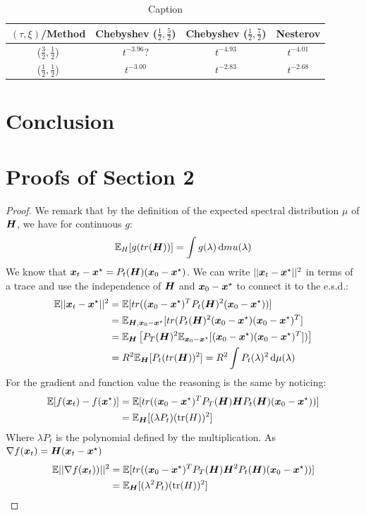 \documentclass{article}
\begin{document}
\begin{table}[H]
    \centering
    \begin{tabular}{c|c|c|c}
         $(\tau,\xi)$/Method& Chebyshev ($\frac{1}{2},\frac{5}{2}$) & Chebyshev ($\frac{1}{2},\frac{7}{2}$) &  Nesterov  \\
         \hline
         ($\frac{3}{2},\frac{1}{2}$)&$t^{-3.96}$? & $t^{-4.93}$ & $t^{-4.01}$\\
         \hline
         ($\frac{1}{2},\frac{1}{2}$)&$t^{-3.00}$ & $t^{-2.83}$ & $t^{-2.68}$
         
    \end{tabular}
    \caption{Caption}
    \label{tab:experimental rates}
\end{table}


\section{Conclusion}
\printbibliography
\appendix
\newpage
\section{Proofs of Section 2}
\metrics*
\begin{proof}
\newcommand\xinit{\xx_0-\xx^\star}
We remark that by the definition of the expected spectral distribution $\mu$ of ${\boldsymbol H}$, we have for continuous $g$:
\begin{equation}
    {\mathbb{E}}_H[g(tr({\boldsymbol H}))]=\int g(\lambda)\mathop{}\!\mathrm{d} mu(\lambda)
\end{equation}
We know that $\xx_t-\xx^\star=P_t(\HH)(\xinit)$. We can write $||{\boldsymbol x}_t-{\boldsymbol x}^\star||^2$ in terms of a trace and use the independence of ${\boldsymbol H}$ and $\xinit$ to connect it to the e.s.d.:
\begin{align}
    \mathbb{E}||\xx_t-\xx^\star||^2&=\EE[ tr((\xinit)^TP_t(\HH)^2(\xinit))] \\
    &=\EE_{\HH,\xinit} [tr(P_t(\HH)^2(\xinit)(\xinit)^T]\\
    &=\EE_\HH\left[P_T(\HH)^2\EE_{\xinit}[(\xinit)(\xinit)^T])\right]  \\
    &=R^2\EE_\HH[P_t(tr(\HH))^2]=R^2 \int P_t(\lambda)^2\dif\mu(\lambda)
\end{align}
For the gradient and function value the reasoning is the same by noticing:
\begin{align}
    \EE[f(\xx_t)-f(\xx^\star)]&=\EE[ tr((\xinit)^TP_T(\HH)\HH P_t(\HH)(\xinit))]\\
    &=\EE_\HH[(\lambda P_t)(\tr(H))^2] 
\end{align}
Where $\lambda P_t$ is the polynomial defined by the multiplication. As $\nabla f({\boldsymbol x}_t)={\boldsymbol H}({\boldsymbol x}_t-{\boldsymbol x}^\star)$
\begin{align}
    \EE||\nabla f(\xx_t))||^2&=\EE[ tr((\xinit)^TP_T(\HH)\HH^2 P_t(\HH)(\xinit))]\\
    &=\EE_\HH[(\lambda^2 P_t)(\tr(H))^2]
\end{align}


\end{proof}
\end{document}
